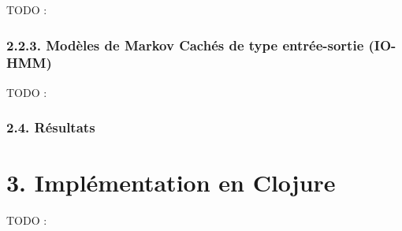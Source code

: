\documentclass[letterpaper]{article}
\begin{document}
TODO : \citep{JP} \citep{DR}

\subsubsection*{2.2.3. Modèles de Markov Cachés de type entrée-sortie (IO-HMM)}

TODO : \citep{YB}

\subsubsection*{2.4. Résultats}

\begin{table}[h]
\vskip 0.25cm
\caption{Évaluation des méthodes présentées selon différents indices :
ACC (accuracy), REL (relative keys), PAR (parallel keys) et OBF (out-by-a-fifth keys).
Le tableau reprend les scores du modèle cognitif (COGN), du modèle d\textquotesingle autocorrélation,
des modèles de Markov cachés (HMM), et du modèle de Markov caché d\textquotesingle entrée-sortie (IO-HMM).}
\end{table}

\section{3. Implémentation en Clojure}

TODO : \citep{SK}


\footnotesize


\end{document}
